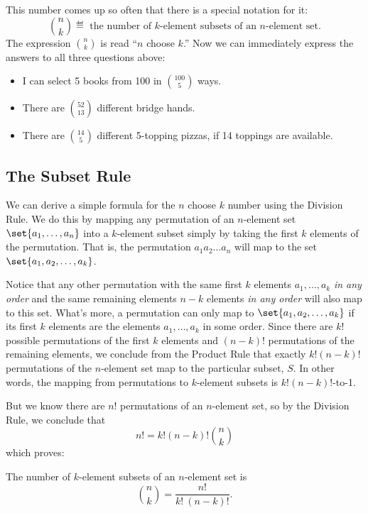 This number comes up so often that there is a special notation for it:
\[
\binom{n}{k} \eqdef \text{ the number of $k$-element subsets of an $n$-element set.}
\]
The expression $\binom{n}{k}$ is read ``$n$ choose $k$.''  Now we can
immediately express the answers to all three questions above:

\begin{itemize}

\item I can select 5 books from 100 in $\binom{100}{5}$ ways.

\item There are $\binom{52}{13}$ different bridge hands.

\item There are $\binom{14}{5}$ different 5-topping pizzas, if 14
toppings are available.

\end{itemize}

\subsection{The Subset Rule}

We can derive a simple formula for the $n$ choose $k$ number using the
Division Rule.  We do this by mapping any permutation of an $n$-element
set $\set{a_1,\dots, a_n}$ into a $k$-element subset simply by taking the
first $k$ elements of the permutation.  That is, the permutation
$a_1a_2\dots a_n$ will map to the set $\set{a_1,a_2,\dots,a_k}$.

Notice that any other permutation with the same first $k$ elements
$a_1,\dots,a_k$ \emph{in any order} and the same remaining elements $n-k$
elements \emph{in any order} will also map to this set.  What's more, a
permutation can only map to $\set{a_1,a_2,\dots,a_k}$ if its first $k$
elements are the elements $a_1,\dots,a_k$ in some order.  Since there are
$k!$ possible permutations of the first $k$ elements and $(n-k)!$
permutations of the remaining elements, we conclude from the Product Rule
that exactly $k!(n-k)!$ permutations of the $n$-element set map to the
particular subset, $S$.  In other words, the mapping from permutations to
$k$-element subsets is $k!(n-k)!$-to-1.

But we know there are $n!$ permutations of an $n$-element set, so by the
Division Rule, we conclude that
\[
n!= k!(n-k)!\binom{n}{k}
\]
which proves:
\begin{rul}
\label{rule:subset}
The number of $k$-element subsets of an $n$-element set is
\begin{equation*}
    \binom{n}{k} = \frac{n!}{k!\ (n-k)!}.
\end{equation*}
\end{rul}

